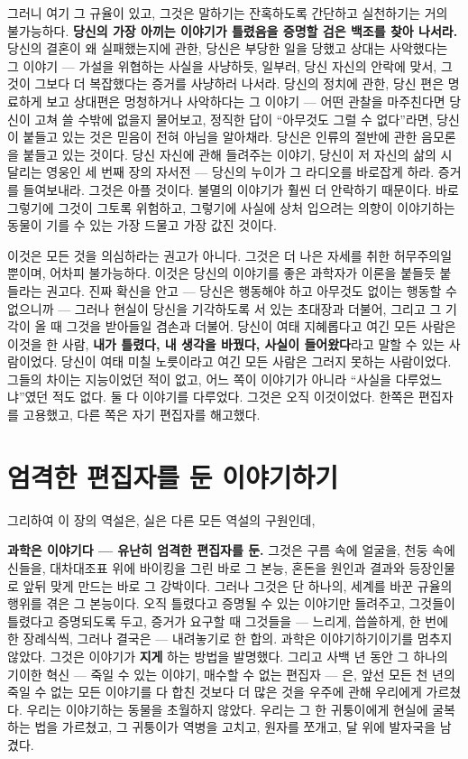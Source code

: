 그러니 여기 그 규율이 있고, 그것은 말하기는 잔혹하도록 간단하고 실천하기는 거의 불가능하다. \textbf{당신의 가장 아끼는 이야기가 틀렸음을 증명할 검은 백조를 찾아 나서라.} 당신의 결혼이 왜 실패했는지에 관한, 당신은 부당한 일을 당했고 상대는 사악했다는 그 이야기 — 가설을 위협하는 사실을 사냥하듯, 일부러, 당신 자신의 안락에 맞서, 그것이 그보다 더 복잡했다는 증거를 사냥하러 나서라. 당신의 정치에 관한, 당신 편은 명료하게 보고 상대편은 멍청하거나 사악하다는 그 이야기 — 어떤 관찰을 마주친다면 당신이 고쳐 쓸 수밖에 없을지 물어보고, 정직한 답이 ``아무것도 그럴 수 없다''라면, 당신이 붙들고 있는 것은 믿음이 전혀 아님을 알아채라. 당신은 인류의 절반에 관한 음모론을 붙들고 있는 것이다. 당신 자신에 관해 들려주는 이야기, 당신이 저 자신의 삶의 시달리는 영웅인 세 번째 장의 자서전 — 당신의 누이가 그 라디오를 바로잡게 하라. 증거를 들여보내라. 그것은 아플 것이다. 불멸의 이야기가 훨씬 더 안락하기 때문이다. 바로 그렇기에 그것이 그토록 위험하고, 그렇기에 사실에 상처 입으려는 의향이 이야기하는 동물이 기를 수 있는 가장 드물고 가장 값진 것이다.

이것은 모든 것을 의심하라는 권고가 아니다. 그것은 더 나은 자세를 취한 허무주의일 뿐이며, 어차피 불가능하다. 이것은 당신의 이야기를 좋은 과학자가 이론을 붙들듯 붙들라는 권고다. 진짜 확신을 안고 — 당신은 행동해야 하고 아무것도 없이는 행동할 수 없으니까 — 그러나 현실이 당신을 기각하도록 서 있는 초대장과 더불어, 그리고 그 기각이 올 때 그것을 받아들일 겸손과 더불어. 당신이 여태 지혜롭다고 여긴 모든 사람은 이것을 한 사람, \textbf{내가 틀렸다, 내 생각을 바꿨다, 사실이 들어왔다}라고 말할 수 있는 사람이었다. 당신이 여태 미칠 노릇이라고 여긴 모든 사람은 그러지 못하는 사람이었다. 그들의 차이는 지능이었던 적이 없고, 어느 쪽이 이야기가 아니라 ``사실을 다루었느냐''였던 적도 없다. 둘 다 이야기를 다루었다. 그것은 오직 이것이었다. 한쪽은 편집자를 고용했고, 다른 쪽은 자기 편집자를 해고했다.

\section*{엄격한 편집자를 둔 이야기하기}

그리하여 이 장의 역설은, 실은 다른 모든 역설의 구원인데,

\textbf{과학은 이야기다 — 유난히 엄격한 편집자를 둔.} 그것은 구름 속에 얼굴을, 천둥 속에 신들을, 대차대조표 위에 바이킹을 그린 바로 그 본능, 혼돈을 원인과 결과와 등장인물로 앞뒤 맞게 만드는 바로 그 강박이다. 그러나 그것은 단 하나의, 세계를 바꾼 규율의 행위를 겪은 그 본능이다. 오직 틀렸다고 증명될 수 있는 이야기만 들려주고, 그것들이 틀렸다고 증명되도록 두고, 증거가 요구할 때 그것들을 — 느리게, 씁쓸하게, 한 번에 한 장례식씩, 그러나 결국은 — 내려놓기로 한 합의. 과학은 이야기하기이기를 멈추지 않았다. 그것은 이야기가 \textbf{지게} 하는 방법을 발명했다. 그리고 사백 년 동안 그 하나의 기이한 혁신 — 죽일 수 있는 이야기, 매수할 수 없는 편집자 — 은, 앞선 모든 천 년의 죽일 수 없는 모든 이야기를 다 합친 것보다 더 많은 것을 우주에 관해 우리에게 가르쳤다. 우리는 이야기하는 동물을 초월하지 않았다. 우리는 그 한 귀퉁이에게 현실에 굴복하는 법을 가르쳤고, 그 귀퉁이가 역병을 고치고, 원자를 쪼개고, 달 위에 발자국을 남겼다.

